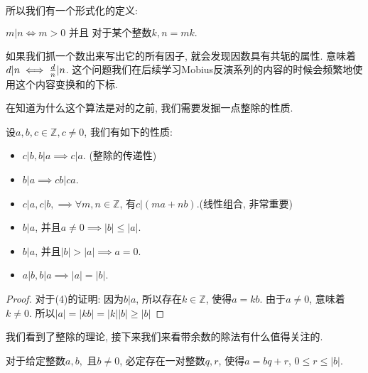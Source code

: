 所以我们有一个形式化的定义: 

\begin{definition}[整除]
    $m | n \iff m>0 \text{ 并且 } \text{对于某个整数}k, n=mk. $
\end{definition}

如果我们抓一个数出来写出它的所有因子, 就会发现因数具有共轭的属性. 意味着$d|n\iff {d\over n}| n$. 
这个问题我们在后续学习Mobius反演系列的内容的时候会频繁地使用这个内容变换和的下标. 

在知道为什么这个算法是对的之前, 我们需要发掘一点整除的性质. 


\begin{theorem}
    设$a,b,c\in \mathbb Z, c\neq 0$, 我们有如下的性质: 
    \begin{itemize}[noitemsep]
        \item $c|b, b|a \implies c|a$. (整除的传递性)
        \item $b|a \implies cb|ca$.
        \item $c|a, c|b, \implies\forall m,n\in \mathbb Z $, 有$c|(ma+nb)$.(线性组合, 非常重要)
        \item $b|a$, 并且$a\neq 0\implies |b|\leq |a|$. 
        \item $b|a$, 并且$|b|>|a|\implies a=0$.
        \item $a|b, b|a\implies |a|=|b|$.  
    \end{itemize}
\end{theorem}

\begin{proof}
    对于(4)的证明: 因为$b|a$, 所以存在$k\in \mathbb Z$, 使得$a=kb$. 由于$a\neq 0$, 意味着
    $k\neq 0$. 所以$|a|=|kb|=|k||b|\geq|b|$
\end{proof}

我们看到了整除的理论, 接下来我们来看带余数的除法有什么值得关注的.

\begin{theorem}[带余除法]
    对于给定整数$a,b,$ 且$b\neq 0$, 必定存在一对整数$q,r$, 使得$a=bq+r$, $0\leq r \leq |b|$.
\end{theorem}


